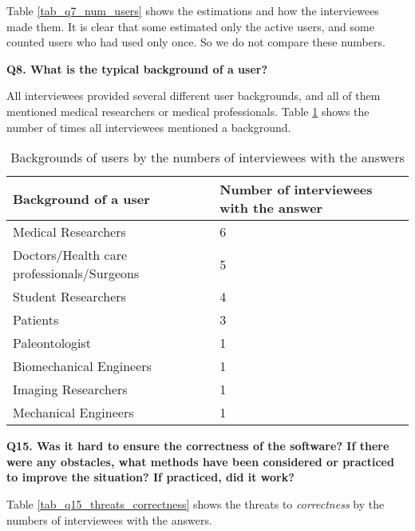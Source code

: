 Table \ref{tab_q7_num_users} shows the estimations and how the interviewees made them. It is clear that some estimated only the active users, and some counted users who had used only once. So we do not compare these numbers.

\noindent\textbf{Q8. What is the typical background of a user?}

All interviewees provided several different user backgrounds, and all of them mentioned medical researchers or medical professionals. Table \ref{tab_q8_user_backgrounds} shows the number of times all interviewees mentioned a background.

\begin{table}[H]
\centering
\begin{tabular}{ll}
\hline
Background of a user & Number of interviewees with the answer \\ \hline
Medical Researchers & 6 \\
Doctors/Health care professionals/Surgeons & 5 \\
Student Researchers & 4 \\
Patients & 3 \\
Paleontologist & 1 \\
Biomechanical Engineers & 1 \\
Imaging Researchers & 1 \\
Mechanical Engineers & 1 \\ \hline
\end{tabular}
\caption{\label{tab_q8_user_backgrounds}Backgrounds of users by the numbers of interviewees with the answers}
\end{table}

\noindent\textbf{Q15. Was it hard to ensure the correctness of the software? If there were any obstacles, what methods have been considered or practiced to improve the situation? If practiced, did it work?}

Table \ref{tab_q15_threats_correctness} shows the threats to \textit{correctness} by the numbers of interviewees with the answers.

